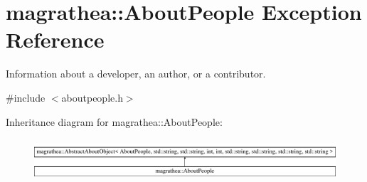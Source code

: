 \hypertarget{exceptionmagrathea_1_1AboutPeople}{\section{magrathea\-:\-:About\-People Exception Reference}
\label{exceptionmagrathea_1_1AboutPeople}
}


Information about a developer, an author, or a contributor.  




{\ttfamily \#include $<$aboutpeople.\-h$>$}

Inheritance diagram for magrathea\-:\-:About\-People\-:\begin{figure}[H]
\begin{center}
\leavevmode
\includegraphics[height=1.568627cm]{exceptionmagrathea_1_1AboutPeople}
\end{center}
\end{figure}
